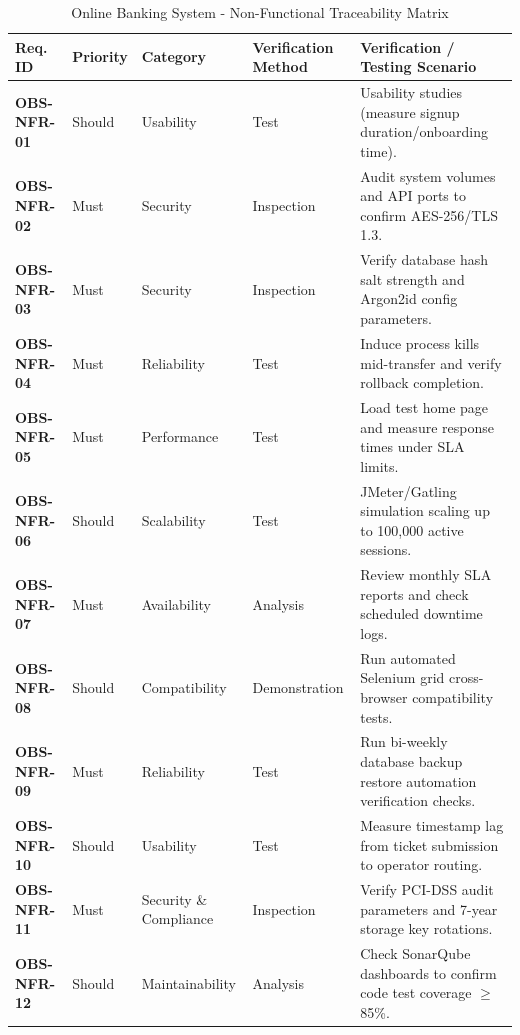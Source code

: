 \documentclass[11pt,a4paper]{article}
\begin{document}
\begin{table}[H]
\centering
\caption{Online Banking System - Non-Functional Traceability Matrix}
\label{tab:nonfunctional_rtm}
\footnotesize
\singlespacing
\begin{tabular}{p{2.0cm} p{1.4cm} p{2.6cm} p{2.6cm} p{4.8cm}}
\toprule
\textbf{Req. ID} & \textbf{Priority} & \textbf{Category} & \textbf{Verification Method} & \textbf{Verification / Testing Scenario} \\ \midrule
\textbf{OBS-NFR-01} & Should & Usability & Test & Usability studies (measure signup duration/onboarding time). \\ \midrule
\textbf{OBS-NFR-02} & Must & Security & Inspection & Audit system volumes and API ports to confirm AES-256/TLS 1.3. \\ \midrule
\textbf{OBS-NFR-03} & Must & Security & Inspection & Verify database hash salt strength and Argon2id config parameters. \\ \midrule
\textbf{OBS-NFR-04} & Must & Reliability & Test & Induce process kills mid-transfer and verify rollback completion. \\ \midrule
\textbf{OBS-NFR-05} & Must & Performance & Test & Load test home page and measure response times under SLA limits. \\ \midrule
\textbf{OBS-NFR-06} & Should & Scalability & Test & JMeter/Gatling simulation scaling up to 100,000 active sessions. \\ \midrule
\textbf{OBS-NFR-07} & Must & Availability & Analysis & Review monthly SLA reports and check scheduled downtime logs. \\ \midrule
\textbf{OBS-NFR-08} & Should & Compatibility & Demonstration & Run automated Selenium grid cross-browser compatibility tests. \\ \midrule
\textbf{OBS-NFR-09} & Must & Reliability & Test & Run bi-weekly database backup restore automation verification checks. \\ \midrule
\textbf{OBS-NFR-10} & Should & Usability & Test & Measure timestamp lag from ticket submission to operator routing. \\ \midrule
\textbf{OBS-NFR-11} & Must & Security \& Compliance & Inspection & Verify PCI-DSS audit parameters and 7-year storage key rotations. \\ \midrule
\textbf{OBS-NFR-12} & Should & Maintainability & Analysis & Check SonarQube dashboards to confirm code test coverage $\ge$ 85\%. \\ \bottomrule
\end{tabular}
\end{table}
\end{document}
